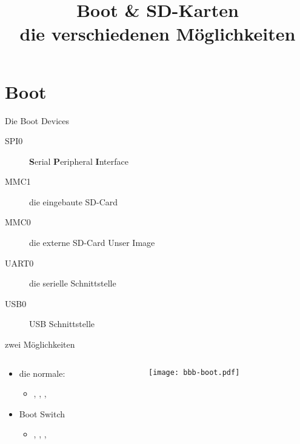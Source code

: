 
\newcommand{\md}{\cod{md-bbb-{\em version}.img}}
\newcommand{\mdev}{\cod{md-bbb-devel-{\em version}.tar.gz}}
\title[Boot]{Boot \& SD-Karten\\die verschiedenen Möglichkeiten}


\section{Boot}
\begin{frame}{\target} {Die Boot Devices}
  \begin{description}
   \item[SPI0] {\bf S}erial {\bf P}eripheral {\bf I}nterface
   \item[MMC1] die eingebaute SD-Card 
   \item[MMC0] die externe SD-Card \alert{Unser Image}
   \item[UART0] die serielle Schnittstelle
   \item[USB0] USB Schnittstelle
  \end{description}
\end{frame}

\begin{frame}{\target}{zwei Möglichkeiten}
\begin{columns}
\begin{column}{0.5\textwidth}
 \begin{itemize}
  \item die normale:
   \begin{itemize}
    \item {}, , , 
   \end{itemize}
   \item Boot Switch
   \begin{itemize}
    \item {}, , , 
   \end{itemize}
 \end{itemize}
\end{column}
\begin{column}{0.5\textwidth}
 \texttt{[image: bbb-boot.pdf]}
\end{column}
\end{columns} 
\end{frame}

